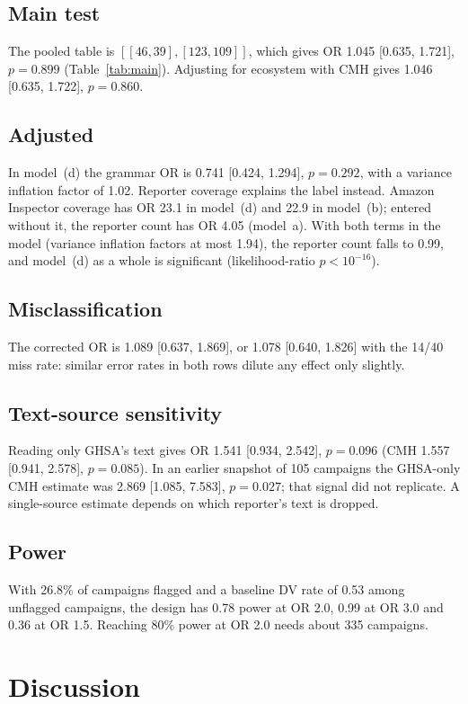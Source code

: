 \documentclass[10pt,conference]{IEEEtran}
\begin{document}
\subsection{Main test}
The pooled table is $[[46,39],[123,109]]$, which gives OR 1.045 [0.635,
1.721], $p=0.899$ (Table~\ref{tab:main}). Adjusting for ecosystem with CMH
gives 1.046 [0.635, 1.722], $p=0.860$.

\subsection{Adjusted}
In model~(d) the grammar OR is 0.741 [0.424, 1.294], $p=0.292$, with a
variance inflation factor of 1.02. Reporter coverage explains the label
instead. Amazon Inspector coverage has OR 23.1 in model~(d) and 22.9 in
model~(b); entered without it, the reporter count has OR 4.05 (model~a).
With both terms in the model (variance inflation factors at most 1.94), the
reporter count falls to 0.99, and model~(d) as a whole is significant
(likelihood-ratio $p<10^{-16}$).

\subsection{Misclassification}
The corrected OR is 1.089 [0.637, 1.869], or 1.078 [0.640, 1.826] with the
14/40 miss rate: similar error rates in both rows dilute any effect only
slightly.

\subsection{Text-source sensitivity}
\label{sec:ghsa}
Reading only GHSA's text gives OR 1.541 [0.934, 2.542], $p=0.096$ (CMH
1.557 [0.941, 2.578], $p=0.085$). In an earlier snapshot of 105 campaigns
the GHSA-only CMH estimate was 2.869 [1.085, 7.583], $p=0.027$; that signal
did not replicate. A single-source estimate depends on which reporter's
text is dropped.

\subsection{Power}
With 26.8\% of campaigns flagged and a baseline DV rate of 0.53 among
unflagged campaigns, the design has 0.78 power at OR 2.0, 0.99 at OR 3.0
and 0.36 at OR 1.5. Reaching 80\% power at OR 2.0 needs about 335 campaigns.

\section{Discussion}
\label{sec:discussion}
\end{document}
